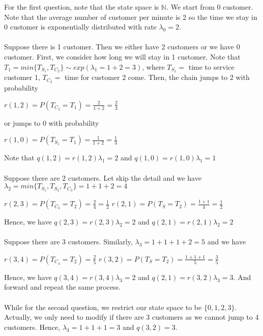 \documentclass[12pt]{article}
\begin{document}
\noindent For the first question, note that the state space is $\mathbb{N}$. We start from 0 customer. Note that the average number of customer per minute is 2 so the time we stay in 0 customer is exponentially distributed with rate $\lambda_0 = 2$.
\\
\\ Suppose there is 1 customer. Then we either have 2 customers or we have 0 customer. First, we consider how long we will stay in 1 customer. Note that $T_1 = min\{T_{S_1}, T_{C_2}\} \sim exp(\lambda_1 = 1 + 2 = 3)$, where $T_{S_1} = $ time to service customer 1, $T_{C_2} = $ time for customer 2 come. Then, the chain jumps to 2 with probability
\begin{center}
    $r(1,2) = P(T_{C_2} = T_1) = \frac{2}{1+2} = \frac{2}{3}$
\end{center}
or jumps to 0 with probability
\begin{center}
    $r(1,0) = P(T_{S_1} = T_1) = \frac{1}{1+2} = \frac{1}{3}$
\end{center}
\noindent Note that $q(1,2) = r(1,2)\lambda_1 = 2$ and $q(1,0) = r(1,0)\lambda_1 = 1$
\\
\\ Suppose there are 2 customers. Let skip the detail and we have $\lambda_2 = min\{T_{S_1}, T_{S_2}, T_{C_3} \} = 1 + 1 + 2 = 4$
\begin{center}
    $r(2,3) = P(T_{C_3} = T_2) = \frac{2}{4} = \frac{1}{2}$
    $r(2,1) = P(T_{S} = T_2) = \frac{1+1}{4} = \frac{1}{2}$
\end{center}
\noindent Hence, we have $q(2,3) = r(2,3)\lambda_2 = 2$ and $q(2,1) = r(2,1)\lambda_2 = 2$
\\
\\ Suppose there are 3 customers. Similarly, $\lambda_3 = 1 + 1 + 1 + 2 = 5$ and we have
\begin{center}
    $r(3,4) = P(T_{C_4} = T_2) = \frac{2}{5}$
    $r(3,2) = P(T_{S} = T_2) = \frac{1+1+1}{5} = \frac{3}{5}$
\end{center}
\noindent Hence, we have $q(3,4) = r(3,4)\lambda_3 = 2$ and $q(2,1) = r(3,2)\lambda_3 = 3$. And forward and repeat the same process.
\\
\\While for the second question, we restrict our state space to be $\{0, 1, 2, 3\}$. Actually, we only need to modify if there are 3 customers as we cannot jump to 4 customers. Hence, $\lambda_3 = 1 + 1 + 1 = 3$ and $q(3,2) = 3$.
\end{document}
